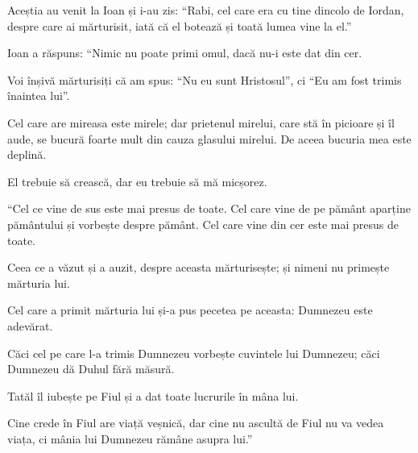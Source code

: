 {Aceștia au venit la Ioan și i-au zis: “Rabi, cel care era cu tine dincolo de Iordan, despre care ai mărturisit, iată că el botează și toată lumea vine la el.”


\par }{\PP {}Ioan a răspuns: “Nimic nu poate primi omul, dacă nu-i este dat din cer.

Voi înșivă mărturisiți că am spus: “Nu eu sunt Hristosul”, ci “Eu am fost trimis înaintea lui”.

Cel care are mireasa este mirele; dar prietenul mirelui, care stă în picioare și îl aude, se bucură foarte mult din cauza glasului mirelui. De aceea bucuria mea este deplină.

El trebuie să crească, dar eu trebuie să mă micșorez.


\par }{\PP {}“Cel ce vine de sus este mai presus de toate. Cel care vine de pe pământ aparține pământului și vorbește despre pământ. Cel care vine din cer este mai presus de toate.

Ceea ce a văzut și a auzit, despre aceasta mărturisește; și nimeni nu primește mărturia lui.

Cel care a primit mărturia lui și-a pus pecetea pe aceasta: Dumnezeu este adevărat.

Căci cel pe care l-a trimis Dumnezeu vorbește cuvintele lui Dumnezeu; căci Dumnezeu dă Duhul fără măsură.

Tatăl îl iubește pe Fiul și a dat toate lucrurile în mâna lui.

Cine crede în Fiul are viață veșnică, dar cine nu ascultă de Fiul nu va vedea viața, ci mânia lui Dumnezeu rămâne asupra lui.”



\par }
